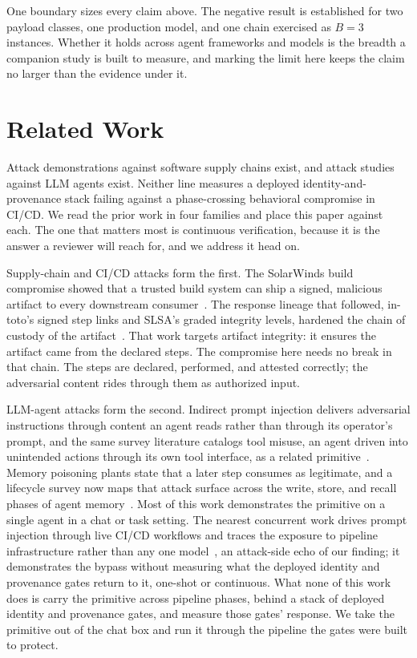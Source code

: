 \documentclass[conference]{IEEEtran}
\begin{document}
One boundary sizes every claim above. The negative result is established for two payload classes, one production model, and one chain exercised as $B=3$ instances. Whether it holds across agent frameworks and models is the breadth a companion study is built to measure, and marking the limit here keeps the claim no larger than the evidence under it.

\section{Related Work}\label{sec:related}

Attack demonstrations against software supply chains exist, and attack studies against LLM agents exist. Neither line measures a deployed identity-and-provenance stack failing against a phase-crossing behavioral compromise in CI/CD. We read the prior work in four families and place this paper against each. The one that matters most is continuous verification, because it is the answer a reviewer will reach for, and we address it head on.

Supply-chain and CI/CD attacks form the first. The SolarWinds build compromise showed that a trusted build system can ship a signed, malicious artifact to every downstream consumer~\cite{solarwinds}. The response lineage that followed, in-toto's signed step links and SLSA's graded integrity levels, hardened the chain of custody of the artifact~\cite{intoto,slsa}. That work targets artifact integrity: it ensures the artifact came from the declared steps. The compromise here needs no break in that chain. The steps are declared, performed, and attested correctly; the adversarial content rides through them as authorized input.

LLM-agent attacks form the second. Indirect prompt injection delivers adversarial instructions through content an agent reads rather than through its operator's prompt, and the same survey literature catalogs tool misuse, an agent driven into unintended actions through its own tool interface, as a related primitive~\cite{ipi1,ipi2}. Memory poisoning plants state that a later step consumes as legitimate, and a lifecycle survey now maps that attack surface across the write, store, and recall phases of agent memory~\cite{memsurvey,mempoison1,mempoison2,mempoison3}. Most of this work demonstrates the primitive on a single agent in a chat or task setting. The nearest concurrent work drives prompt injection through live CI/CD workflows and traces the exposure to pipeline infrastructure rather than any one model~\cite{gitinject}, an attack-side echo of our finding; it demonstrates the bypass without measuring what the deployed identity and provenance gates return to it, one-shot or continuous. What none of this work does is carry the primitive across pipeline phases, behind a stack of deployed identity and provenance gates, and measure those gates' response. We take the primitive out of the chat box and run it through the pipeline the gates were built to protect.
\end{document}
